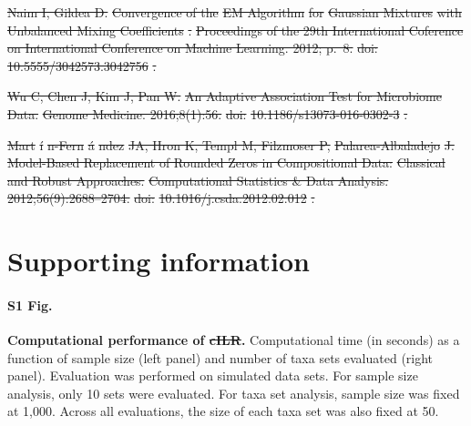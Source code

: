 \documentclass[10pt,letterpaper]{article}
\providecommand{\DIFaddtex}[1]{{\protect\color{blue}\uwave{#1}}} %
\providecommand{\DIFdeltex}[1]{{\protect\color{red}\sout{#1}}}                      %
\providecommand{\DIFaddbegin}{} %
\providecommand{\DIFaddend}{} %
\providecommand{\DIFdelbegin}{} %
\providecommand{\DIFdelend}{} %
\providecommand{\DIFadd}[1]{\texorpdfstring{\DIFaddtex{#1}}{#1}} %
\providecommand{\DIFdel}[1]{\texorpdfstring{\DIFdeltex{#1}}{}} %
\newcommand{\DIFscaledelfig}{0.5}
\newlength{\DIFdelgraphicswidth} %
\newlength{\DIFdelgraphicsheight} %
\newcommand{\DIFaddincludegraphics}[2][]{{\color{blue}\fbox{\DIFOincludegraphics[#1]{#2}}}} %
\newcommand{\DIFdelincludegraphics}[2][]{%
\sbox{\DIFdelgraphicsbox}{\DIFOincludegraphics[#1]{#2}}%
\settoboxwidth{\DIFdelgraphicswidth}{\DIFdelgraphicsbox} %
\settoboxtotalheight{\DIFdelgraphicsheight}{\DIFdelgraphicsbox} %
\scalebox{\DIFscaledelfig}{%
\parbox[b]{\DIFdelgraphicswidth}{\usebox{\DIFdelgraphicsbox}\\[-\baselineskip] \rule{\DIFdelgraphicswidth}{0em}}\llap{\resizebox{\DIFdelgraphicswidth}{\DIFdelgraphicsheight}{%
\setlength{\unitlength}{\DIFdelgraphicswidth}%
\begin{picture}(1,1)%
\thicklines\linethickness{2pt} %
{\color[rgb]{1,0,0}\put(0,0){\framebox(1,1){}}}%
{\color[rgb]{1,0,0}\put(0,0){\line( 1,1){1}}}%
{\color[rgb]{1,0,0}\put(0,1){\line(1,-1){1}}}%
\end{picture}%
}\hspace*{3pt}}} %
} %
\DeclareRobustCommand{\DIFaddbegin}{\DIFOaddbegin \let\includegraphics\DIFaddincludegraphics} %
\DeclareRobustCommand{\DIFaddend}{\DIFOaddend \let\includegraphics\DIFOincludegraphics} %
\DeclareRobustCommand{\DIFdelbegin}{\DIFOdelbegin \let\includegraphics\DIFdelincludegraphics} %
\DeclareRobustCommand{\DIFdelend}{\DIFOaddend \let\includegraphics\DIFOincludegraphics} %
\begin{document}
\DIFdel{Naim I, Gildea D.
}%
\DIFdel{Convergence of the }%
\DIFdel{EM Algorithm}%
\DIFdel{for }%
\DIFdel{Gaussian Mixtures}%
\DIFdel{with
  }%
\DIFdel{Unbalanced Mixing Coefficients}%
\DIFdel{.
}%
\DIFdel{Proceedings of the 29th International Coference on International
  Conference on Machine Learning. 2012; p.~8.
}%
\DIFdel{doi:}%
\DIFdel{10.5555/3042573.3042756}%
\DIFdel{.
}%

\DIFdel{Wu C, Chen J, Kim J, Pan W.
}%
\DIFdel{An Adaptive Association Test for Microbiome Data.
}%
\DIFdel{Genome Medicine. 2016;8(1):56.
}%
\DIFdel{doi:}%
\DIFdel{10.1186/s13073-016-0302-3}%
\DIFdel{.
}%

\DIFdel{Mart}%
\DIFdel{\'i}%
\DIFdel{n-Fern}%
\DIFdel{\'a}%
\DIFdel{ndez}%
\DIFdel{JA, Hron K, Templ M, Filzmoser P,
  }%
\DIFdel{Palarea-Albaladejo}%
\DIFdel{J.
}%
\DIFdel{Model-Based Replacement of Rounded Zeros in Compositional Data:
  }%
\DIFdel{Classical}%
\DIFdel{and Robust Approaches.
}%
\DIFdel{Computational Statistics \& Data Analysis. 2012;56(9):2688--2704.
}%
\DIFdel{doi:}%
\DIFdel{10.1016/j.csda.2012.02.012}%
\DIFdel{.
}%


\DIFdelend \section*{Supporting information}

\paragraph*{S1 Fig.}
\label{S1_Fig}
{\bf Computational performance of \DIFdelbegin \DIFdel{cILR}\DIFdelend \DIFaddbegin \DIFadd{CBEA}\DIFaddend .} Computational time (in seconds) as a function of sample size (left panel) and number of taxa sets evaluated (right panel). Evaluation was performed on simulated data sets. For sample size analysis, only 10 sets were evaluated. For taxa set analysis, sample size was fixed at 1,000. Across all evaluations, the size of each taxa set was also fixed at 50. 
\end{document}
